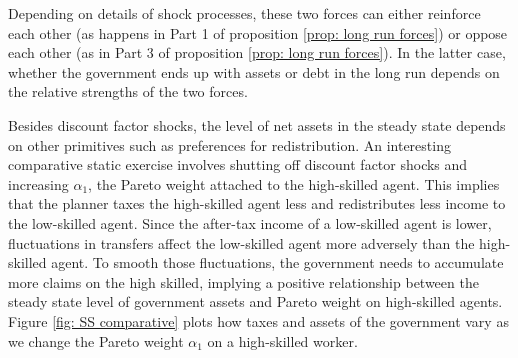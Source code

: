 \documentclass[thmsb,11pt]{article}
\begin{document}

Depending on  details of shock processes, these two forces can
either reinforce each other (as happens in Part 1 of  proposition \ref{prop: long run forces}) or oppose each other (as in Part 3 of  proposition \ref{prop: long run forces}). In the latter case, whether the
government ends up with assets or debt in the long run depends on the
relative strengths of the two forces.


 Besides discount factor shocks, the level of net assets in the steady state depends on other primitives such as preferences for redistribution. An interesting comparative static exercise involves shutting off discount factor shocks and increasing  $\alpha_1$, the Pareto weight attached to the high-skilled agent. This implies that the planner taxes  the high-skilled agent less and redistributes less income to the low-skilled agent. Since the after-tax income of a low-skilled agent is lower,  fluctuations in transfers affect the low-skilled agent more adversely than the high-skilled
 agent. To smooth those fluctuations, the government needs to accumulate more claims on the high skilled, implying a positive relationship between the steady state level of government assets and Pareto weight on high-skilled agents. Figure \ref{fig: SS comparative} plots how taxes and assets of the government vary as we change the Pareto weight  $\alpha_1$ on a high-skilled worker.


%
%
\end{document}
